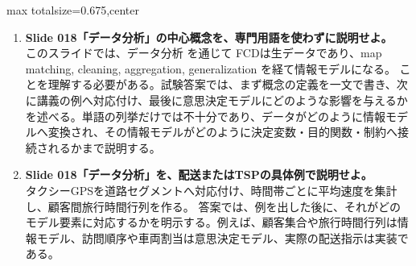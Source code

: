 \begin{adjustbox}{max totalsize={\textwidth}{0.675\textheight},center}
\begin{minipage}{\textwidth}
\begin{minipage}[t]{0.485\textwidth}
\begin{enumerate}
\item \textbf{Slide 018「データ分析」の中心概念を、専門用語を使わずに説明せよ。}\\このスライドでは、データ分析 を通じて FCDは生データであり、map matching, cleaning, aggregation, generalization を経て情報モデルになる。 ことを理解する必要がある。試験答案では、まず概念の定義を一文で書き、次に講義の例へ対応付け、最後に意思決定モデルにどのような影響を与えるかを述べる。単語の列挙だけでは不十分であり、データがどのように情報モデルへ変換され、その情報モデルがどのように決定変数・目的関数・制約へ接続されるかまで説明する。
\item \textbf{Slide 018「データ分析」を、配送またはTSPの具体例で説明せよ。}\\タクシーGPSを道路セグメントへ対応付け、時間帯ごとに平均速度を集計し、顧客間旅行時間行列を作る。 答案では、例を出した後に、それがどのモデル要素に対応するかを明示する。例えば、顧客集合や旅行時間行列は情報モデル、訪問順序や車両割当は意思決定モデル、実際の配送指示は実装である。
\end{enumerate}
\end{minipage}
\end{minipage}
\end{adjustbox}

